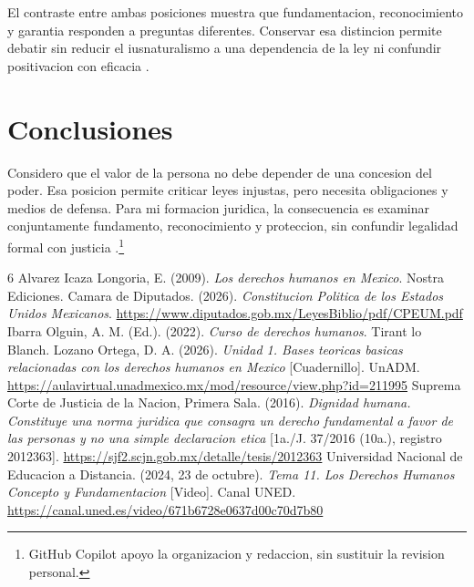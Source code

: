 \documentclass[spanish,letterpaper,oneside]{article}
\begin{document}
El contraste entre ambas posiciones muestra que fundamentacion,
reconocimiento y garantia responden a preguntas diferentes. Conservar
esa distincion permite debatir sin reducir el iusnaturalismo a una
dependencia de la ley ni confundir positivacion con eficacia
\citep{cuadernilloADH2026,ibarraCurso2022ADH}.
\clearpage
\section{Conclusiones}
Considero que el valor de la persona no debe depender de una concesion
del poder. Esa posicion permite criticar leyes injustas, pero necesita
obligaciones y medios de defensa. Para mi formacion juridica, la
consecuencia es examinar conjuntamente fundamento, reconocimiento y
proteccion, sin confundir legalidad formal con justicia
\citep{cuadernilloADH2026,cpeumADH2026}.\footnote{GitHub Copilot apoyo la
organizacion y redaccion, sin sustituir la revision personal.}
\clearpage
\begin{thebibliography}{6}
Alvarez Icaza Longoria, E. (2009). \emph{Los derechos humanos en Mexico}. Nostra Ediciones.
Camara de Diputados. (2026). \emph{Constitucion Politica de los Estados Unidos Mexicanos}.
\url{https://www.diputados.gob.mx/LeyesBiblio/pdf/CPEUM.pdf}
Ibarra Olguin, A. M. (Ed.). (2022). \emph{Curso de derechos humanos}. Tirant lo Blanch.
Lozano Ortega, D. A. (2026). \emph{Unidad 1. Bases teoricas basicas relacionadas con los derechos humanos en Mexico} [Cuadernillo]. UnADM.
\url{https://aulavirtual.unadmexico.mx/mod/resource/view.php?id=211995}
Suprema Corte de Justicia de la Nacion, Primera Sala. (2016).
\emph{Dignidad humana. Constituye una norma juridica que consagra un derecho fundamental a favor de las personas y no una simple declaracion etica}
[1a./J. 37/2016 (10a.), registro 2012363].
\url{https://sjf2.scjn.gob.mx/detalle/tesis/2012363}
Universidad Nacional de Educacion a Distancia. (2024, 23 de octubre).
\emph{Tema 11. Los Derechos Humanos Concepto y Fundamentacion} [Video]. Canal UNED.
\url{https://canal.uned.es/video/671b6728e0637d00c70d7b80}
\end{thebibliography}
\end{document}
